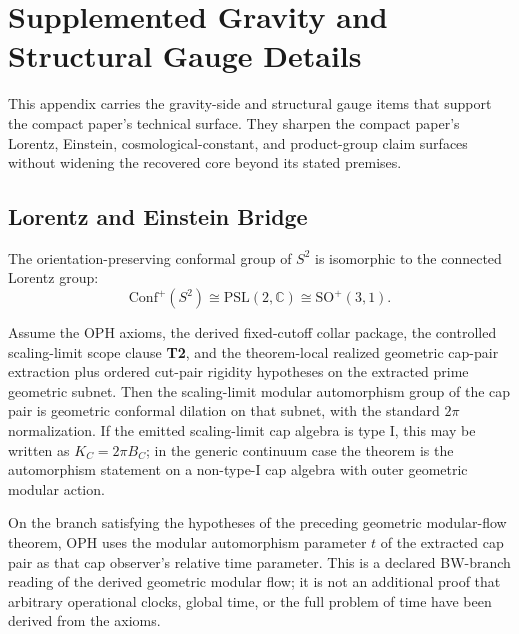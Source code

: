 \section{Supplemented Gravity and Structural Gauge Details}
\label{app:compact-technical-port}

This appendix carries the gravity-side and structural gauge items that support the compact paper's
technical surface. They sharpen the compact paper's Lorentz,
Einstein, cosmological-constant, and product-group claim surfaces without widening the recovered
core beyond its stated premises.

\subsection{Lorentz and Einstein Bridge}

\begin{theorem}
The orientation-preserving conformal group of \(S^2\) is isomorphic to the connected Lorentz
group:
\[
\mathrm{Conf}^+(S^2)\cong \mathrm{PSL}(2,\mathbb C)\cong \mathrm{SO}^+(3,1).
\]
\end{theorem}

\begin{theorem}
Assume the OPH axioms, the derived fixed-cutoff collar package, the controlled scaling-limit
scope clause \textbf{T2}, and the theorem-local realized geometric cap-pair extraction plus
ordered cut-pair rigidity hypotheses on the extracted prime geometric subnet. Then the
scaling-limit modular automorphism group of the cap pair is geometric conformal dilation on that
subnet, with the standard \(2\pi\) normalization. If the emitted scaling-limit cap algebra
is type I, this may be written as \(K_C=2\pi B_C\); in the generic continuum case the
theorem is the automorphism statement on a non-type-I cap algebra with outer geometric modular
action.
\end{theorem}

\begin{definition}
On the branch satisfying the hypotheses of the preceding geometric modular-flow theorem, OPH uses
the modular automorphism parameter \(t\) of the extracted cap pair as that cap observer's relative
time parameter. This is a declared BW-branch reading of the derived geometric modular flow; it is
not an additional proof that arbitrary operational clocks, global time, or the full problem of time
have been derived from the axioms.
\end{definition}

